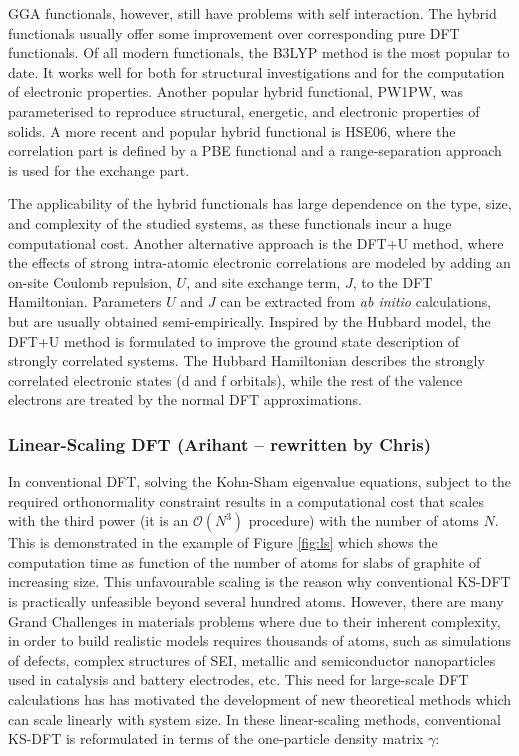 \documentclass[../main.tex]{subfiles}
\begin{document}
GGA functionals, however, still have problems with self interaction. The hybrid functionals usually offer some improvement over corresponding pure DFT functionals. Of all modern functionals, the B3LYP method is the most popular to date. \cite{adb1993b,cl1988785} It works well for both for structural investigations and for the computation of electronic properties. \cite{Cramer} Another popular hybrid functional, PW1PW, \cite{Bredow00,IslamPRB} was parameterised to reproduce structural, energetic, and electronic properties of solids. A more recent and popular hybrid functional is HSE06, where  the correlation part is defined by a PBE functional and a range-separation approach is used for the exchange part. \cite{HSE06}  

The applicability of the hybrid functionals has large dependence on the type, size, and complexity of the studied systems, as these functionals incur a huge computational cost. Another alternative approach is the DFT+U method, where the effects of strong intra-atomic electronic correlations are modeled by adding an on-site Coulomb repulsion, $U$, and site exchange term, $J$, to the DFT Hamiltonian. \cite{DFT-U-1,DFT-U-2,DFT-U-3} Parameters $U$ and $J$ can be extracted from \textit{ab initio} calculations, but are usually obtained semi-empirically. Inspired by the Hubbard model, the DFT+U method is formulated to improve the ground state description of strongly correlated systems. The Hubbard Hamiltonian describes the strongly correlated electronic states (d and f orbitals), while the rest of the valence electrons are treated by the normal DFT approximations. 

\subsubsection{Linear-Scaling DFT (Arihant -- rewritten by Chris)}
\label{sec:lsdft}
In conventional DFT, solving the Kohn-Sham eigenvalue equations, subject to the required  orthonormality constraint results in a computational cost that scales with the third power 
(it is an  $\mathcal{O}(N^3)$ procedure) with the number of atoms $N$. This is demonstrated in the example of   Figure \ref{fig:ls} which shows the computation time as function of the number of atoms for slabs of graphite of increasing size. This unfavourable scaling is the reason why conventional KS-DFT is  practically unfeasible beyond several hundred atoms. However,  there are many Grand Challenges in materials problems where due to their inherent complexity, in order to build realistic models requires 
thousands of atoms, such as simulations of defects, complex structures of SEI, metallic and semiconductor nanoparticles used in catalysis and battery electrodes, etc.
This need for large-scale DFT calculations has 
 has motivated the development of new theoretical methods which can scale linearly with system size.\cite{Goedecker1999} In these linear-scaling methods,  conventional KS-DFT is reformulated in terms of the one-particle density matrix $\gamma$:
\end{document}
